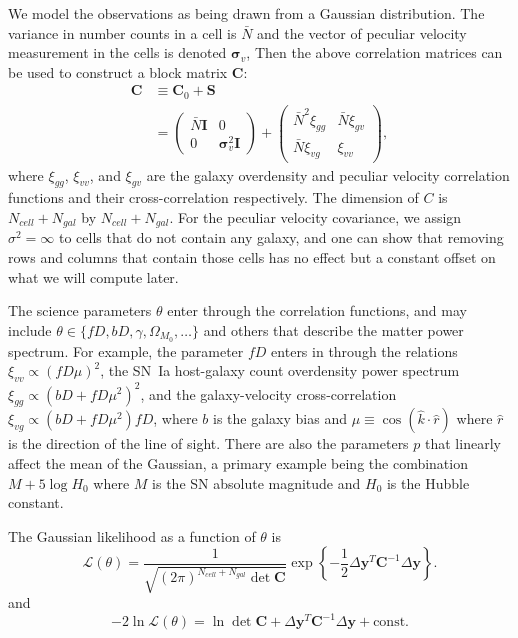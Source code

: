 \documentclass{article}
\begin{document}
We model the observations as being drawn from a Gaussian distribution.
The variance in number counts in a cell is $\bar{N}$ and the vector of peculiar velocity measurement in the cells is denoted $\bm{\sigma}_v$,
  Then the above correlation matrices can be used to construct a block matrix $\textbf{C}$:
\begin{align}
\textbf{C} &\equiv \textbf{C}_0 + \textbf{S}\\
&=
\left(
\begin{array}{cc}
\bar{N}\textbf{I} & 0 \nonumber \\
0 & \bm{\sigma}_v^2\textbf{I}
\end{array}
\right)
+
\begin{pmatrix}
\bar{N}^2\xi_{gg} & \bar{N}\xi_{g v} \\
\bar{N}\xi_{v g} & \xi_{vv}
\end{pmatrix},
\end{align}
where $\xi_{gg}$, $\xi_{vv}$, and $\xi_{g v}$ are the galaxy overdensity and peculiar velocity correlation functions and their cross-correlation
respectively.  
The dimension of $C$ is $N_{cell}+N_{gal}$ by $N_{cell}+N_{gal}$. For the peculiar velocity covariance, we assign $\sigma^2=\infty$ to cells that do not contain any galaxy, and one can show that removing rows and columns that contain those cells has no effect but a constant offset on what we will compute later.


The science parameters $\theta$ enter through the correlation functions, and may include $\theta \in \{fD, bD, \gamma, \Omega_{M_0},\ldots\}$ and others
that describe the matter power spectrum.
For example, the parameter $fD$ enters in through the relations $\xi_{vv}\propto (fD\mu)^2$, the SN~Ia host-galaxy count overdensity
power spectrum $\xi_{g g }\propto (bD + fD\mu^2)^2$, and the galaxy-velocity cross-correlation $\xi_{vg}
\propto  (bD + fD\mu^2)fD$, where $b$ is the galaxy bias and $\mu\equiv \cos{(\hat{k} \cdot \hat{r})}$ where $\hat{r}$ is the direction of
the line of sight.   There are also the parameters $p$ that linearly affect the mean of the Gaussian, a primary example being the combination
$M+5\log{H_0}$ where $M$ is the SN absolute magnitude and $H_0$ is the Hubble constant.


The Gaussian likelihood as a function of $\theta$ is
\[
\mathcal{L}(\theta) = \frac{1}{\sqrt{\left(2\pi\right)^{N_{cell}+N_{gal}} \det \textbf{C}}}\exp\left\{-\frac{1}{2}\Delta \textbf{y}^T\textbf{C}^{-1}\Delta \textbf{y}\right\}.
\]
and
\begin{equation}
-2\ln\mathcal{L}(\theta) = \ln\det\textbf{C} + \Delta \textbf{y}^T\textbf{C}^{-1}\Delta \textbf{y} + \text{const}.
\label{log:eqn}
\end{equation}
\end{document}
